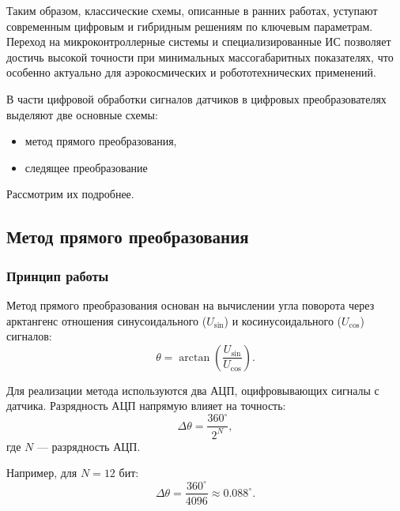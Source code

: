 Таким образом, классические схемы, описанные в ранних работах, уступают современным цифровым и гибридным решениям по ключевым параметрам. 
Переход на микроконтроллерные системы и специализированные ИС позволяет достичь высокой точности при минимальных массогабаритных показателях, 
что особенно актуально для аэрокосмических и робототехнических применений.

В части цифровой обработки сигналов датчиков в цифровых преобразователях выделяют две основные схемы:
\begin{itemize}
    \item метод прямого преобразования,
    \item следящее преобразование
\end{itemize}
Рассмотрим их подробнее.

\subsection{Метод прямого преобразования}
\subsubsection{Принцип работы}
Метод прямого преобразования \cite{Armenski} основан на вычислении угла поворота через арктангенс отношения синусоидального (\(U_{\sin}\)) и косинусоидального (\(U_{\cos}\)) сигналов:
\begin{equation}
\theta = \arctan\left(\frac{U_{\sin}}{U_{\cos}}\right).
\end{equation}


Для реализации метода используются два АЦП, оцифровывающих сигналы с датчика. Разрядность АЦП напрямую влияет на точность: 
\begin{equation}
\Delta\theta = \frac{360^\circ}{2^N},
\end{equation}
где \(N\) — разрядность АЦП.

Например, для \(N = 12\) бит:
\begin{equation}
\Delta\theta = \frac{360^\circ}{4096} \approx 0.088^\circ.
\end{equation}

